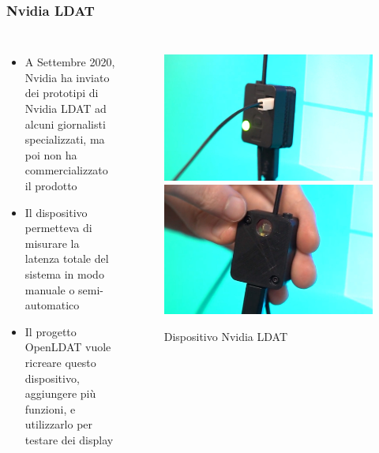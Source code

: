 \documentclass[xcolor={x11names}]{beamer}
\begin{document}
\begin{frame}[shrink=10]
	\frametitle{Nvidia LDAT}
	\begin{columns}
		\begin{itemize}
			\item A Settembre 2020, Nvidia ha inviato dei prototipi di \alert{Nvidia LDAT} ad alcuni giornalisti specializzati, ma poi \alert{non ha commercializzato il prodotto}
			\item Il dispositivo permetteva di misurare la \alert{latenza totale del sistema} in modo manuale o semi-automatico
			\item Il progetto \alert{OpenLDAT} vuole ricreare questo dispositivo, aggiungere più funzioni, e utilizzarlo per testare dei display
		\end{itemize}
		\begin{figure}
			\centering
			\includegraphics[width=\textwidth]{StatoDellArte_files/nvldat_front.jpg}
			\includegraphics[width=\textwidth]{StatoDellArte_files/nvldat_back.jpg}
			\caption*{Dispositivo Nvidia LDAT}
		\end{figure}
		
	\end{columns}
	
\end{frame}
\end{document}
